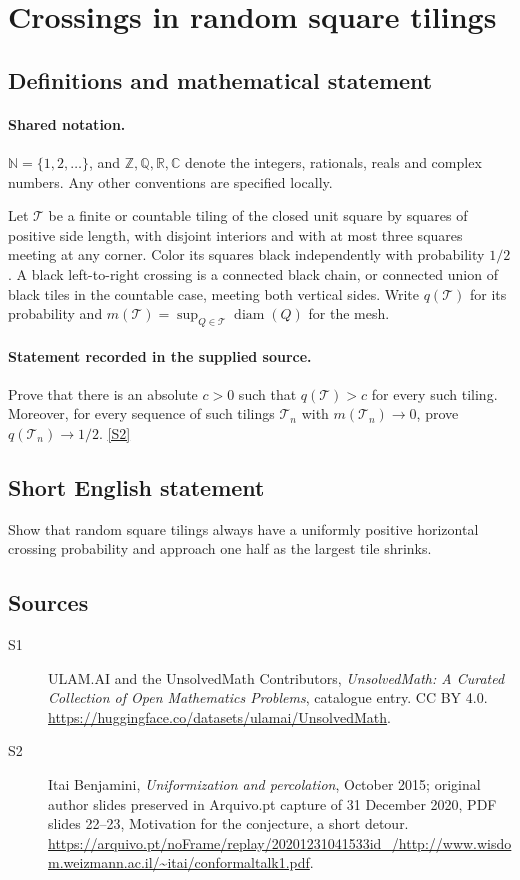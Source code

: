 \documentclass[11pt]{article}
\newcommand{\sref}[2]{\hyperlink{source:#1:#2}{[S#2]}}
\begin{document}
\section{Crossings in random square tilings}\label{statement}

\subsection{Definitions and mathematical statement}

\paragraph{Shared notation.}$\mathbb N=\{1,2,\ldots\}$, and $\mathbb Z,\mathbb Q,\mathbb R,\mathbb C$ denote the integers, rationals, reals and complex numbers. Any other conventions are specified locally.


Let $\mathcal T$ be a finite or countable tiling of the closed unit square by squares of positive side length, with disjoint interiors and with at most three squares meeting at any corner. Color its squares black independently with probability $1/2$. A black left-to-right crossing is a connected black chain, or connected union of black tiles in the countable case, meeting both vertical sides. Write $q(\mathcal T)$ for its probability and $m(\mathcal T)=\sup_{Q\in\mathcal T}\operatorname{diam}(Q)$ for the mesh.
\paragraph{Statement recorded in the supplied source.}
Prove that there is an absolute $c>0$ such that $q(\mathcal T)>c$ for every such tiling. Moreover, for every sequence of such tilings $\mathcal T_n$ with $m(\mathcal T_n)\to0$, prove $q(\mathcal T_n)\to1/2$. \sref{statement}{2}
\subsection{Short English statement}
Show that random square tilings always have a uniformly positive horizontal crossing probability and approach one half as the largest tile shrinks.
\subsection{Sources}
\begin{description}
\item[\hypertarget{source:statement:1}{S1}] ULAM.AI and the UnsolvedMath Contributors, \emph{UnsolvedMath: A Curated Collection of Open Mathematics Problems}, catalogue entry. CC BY 4.0. \url{https://huggingface.co/datasets/ulamai/UnsolvedMath}.
\item[\hypertarget{source:statement:2}{S2}] Itai Benjamini, \emph{Uniformization and percolation}, October 2015; original author slides preserved in Arquivo.pt capture of 31 December 2020, PDF slides 22--23, Motivation for the conjecture, a short detour. \url{https://arquivo.pt/noFrame/replay/20201231041533id_/http://www.wisdom.weizmann.ac.il/~itai/conformaltalk1.pdf}.
\end{description}
\label{end:statement}
\end{document}
